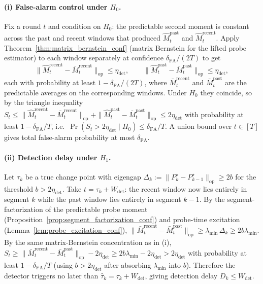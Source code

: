 \documentclass{article}
\newcommand{\op}{\mathrm{op}}
\begin{document}
\paragraph{(i) False-alarm control under $H_0$.}
Fix a round $t$ and condition on $H_0$: the predictable second moment
is constant across the past and recent windows that produced
$\widehat M_t^{\mathrm{past}}$ and $\widehat M_t^{\mathrm{recent}}$.
Apply Theorem~\ref{thm:matrix_bernstein_conf} (matrix Bernstein for
the lifted probe estimator) to each window separately at confidence
$\delta_{\mathrm{FA}}/(2T)$ to get
\[
\bigl\|\widehat M_t^{\mathrm{recent}}-\bar M_t^{\mathrm{recent}}\bigr\|_{\op}
\le \eta_{\mathrm{det}},
\qquad
\bigl\|\widehat M_t^{\mathrm{past}}-\bar M_t^{\mathrm{past}}\bigr\|_{\op}
\le \eta_{\mathrm{det}},
\]
each with probability at least $1-\delta_{\mathrm{FA}}/(2T)$, where
$\bar M_t^{\mathrm{recent}}$ and $\bar M_t^{\mathrm{past}}$ are the
predictable averages on the corresponding windows. Under $H_0$ they
coincide, so by the triangle inequality
$S_t \le \|\widehat M_t^{\mathrm{recent}}-\bar M_t^{\mathrm{recent}}\|_{\op}+\|\widehat M_t^{\mathrm{past}}-\bar M_t^{\mathrm{past}}\|_{\op}\le 2\eta_{\mathrm{det}}$
with probability at least $1-\delta_{\mathrm{FA}}/T$, i.e.\
$\Pr(S_t>2\eta_{\mathrm{det}}\mid H_0)\le \delta_{\mathrm{FA}}/T$.
A union bound over $t\in[T]$ gives total false-alarm probability at
most $\delta_{\mathrm{FA}}$.

\paragraph{(ii) Detection delay under $H_1$.}
Let $\tau_k$ be a true change point with eigengap
$\Delta_k:=\|P_k^\star-P_{k-1}^\star\|_{\op}\ge 2b$ for the
threshold $b>2\eta_{\mathrm{det}}$. Take $t=\tau_k+W_{\mathrm{det}}$:
the recent window now lies entirely in segment $k$ while the past
window lies entirely in segment $k-1$. By the segment-factorization
of the predictable probe moment
(Proposition~\ref{prop:segment_factorization_conf}) and probe-time
excitation (Lemma~\ref{lem:probe_excitation_conf}),
$\|\bar M_t^{\mathrm{recent}}-\bar M_t^{\mathrm{past}}\|_{\op}
\ge \lambda_{\min}\,\Delta_k\ge 2b\lambda_{\min}$. By the same
matrix-Bernstein concentration as in (i),
$S_t \ge \|\bar M_t^{\mathrm{recent}}-\bar M_t^{\mathrm{past}}\|_{\op}-2\eta_{\mathrm{det}}\ge 2b\lambda_{\min}-2\eta_{\mathrm{det}}>2\eta_{\mathrm{det}}$
with probability at least $1-\delta_{\mathrm{FA}}/T$ (using
$b>2\eta_{\mathrm{det}}$ after absorbing $\lambda_{\min}$ into $b$).
Therefore the detector triggers no later than
$\widehat\tau_k=\tau_k+W_{\mathrm{det}}$, giving detection delay
$D_k\le W_{\mathrm{det}}$.
\end{document}
